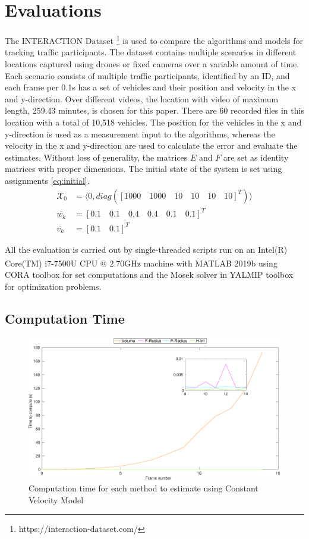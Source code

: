 \chapter{Evaluations} \label{ch:result}
The INTERACTION Dataset \footnote{https://interaction-dataset.com/} is used to compare the algorithms and models for tracking traffic participants. The dataset contains multiple scenarios in different locations captured using drones or fixed cameras over a variable amount of time. Each scenario consists of multiple traffic participants, identified by an ID, and each frame per 0.1s has a set of vehicles and their position and velocity in the x and y-direction. Over different videos, the location with video of maximum length, 259.43 minutes, is chosen for this paper. There are 60 recorded files in this location with a total of 10,518 vehicles. The position for the vehicles in the x and y-direction is used as a measurement input to the algorithms, whereas the velocity in the x and y-direction are used to calculate the error and evaluate the estimates. Without loss of generality, the matrices $E$ and $F$ are set as identity matrices with proper dimensions. The initial state of the system is set using assignments \eqref{eq:initial}.
\begin{equation}
\label{eq:initial}
\begin{split}
\mathcal{X}_0 &= \langle 0, diag([1000\quad 1000\quad 10 \quad10\quad 10\quad 10]^T) \rangle\\
\overline{w_k} &= [0.1\quad 0.1\quad 0.4\quad 0.4\quad 0.1\quad 0.1]^T\\
\overline{v_k} &= [0.1\quad 0.1]^T
\end{split}
\end{equation}

All the evaluation is carried out by single-threaded scripts run on an Intel(R) Core(TM) i7-7500U CPU @ 2.70GHz machine with MATLAB\textsuperscript{\tiny\textregistered} 2019b using CORA toolbox for set computations and the Mosek solver in YALMIP toolbox for optimization problems.

\section{Computation Time}
\begin{figure}[htbp]
\centering
\includegraphics[width=\linewidth]{figures/timegraphh}
\caption{Computation time for each method to estimate using Constant Velocity Model}
\label{fig:timegraph}
\end{figure}

